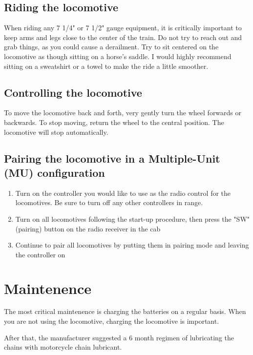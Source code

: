 \documentclass{book}
\begin{document}
\section{Riding the locomotive}

When riding any 7 1/4" or 7 1/2" gauge equipment, it is critically important to keep arms and legs close to the center of the train. Do not try to reach out and grab things, as you could cause a derailment. Try to sit centered on the locomotive as though sitting on a horse's saddle. I would highly recommend sitting on a sweatshirt or a towel to make the ride a little smoother.

\section{Controlling the locomotive}

To move the locomotive back and forth, very gently turn the wheel forwards or backwards.
To stop moving, return the wheel to the central position. The locomotive will stop automatically.

\section{Pairing the locomotive in a Multiple-Unit (MU) configuration}

\begin {enumerate}
    \item {Turn on the controller you would like to use as the radio control for the locomotives. Be sure to turn off any other controllers in range.}
    \item {Turn on all locomotives following the start-up procedure, then press the "SW" (pairing) button on the radio receiver in the cab}
    \item {Continue to pair all locomotives by putting them in pairing mode and leaving the controller on}
\end {enumerate}

\chapter{Maintenence}

The most critical maintenence is charging the batteries on a regular basis. When you are not using the locomotive, charging the locomotive is important.
\par\vspace{3mm}
After that, the manufacturer suggested a 6 month regimen of lubricating the chains with motorcycle chain lubricant.
\end{document}
